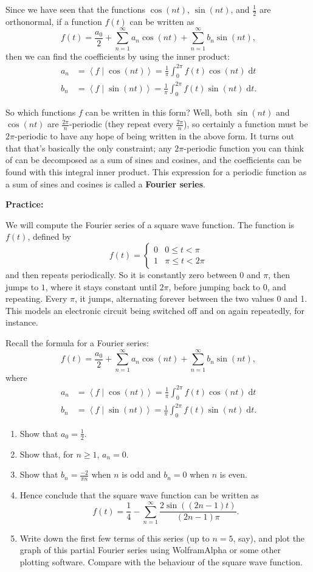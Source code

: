 \documentclass{article}
\newcommand{\diff}{\;\mathrm{d}}
\newcommand{\braket}[2]{\left\langle #1 \mid #2 \right\rangle}
\begin{document}
Since we have seen that the functions $\cos(nt)$, $\sin(nt)$, and $\frac{1}{2}$ are orthonormal, if a function $f(t)$ can be written as
\[f(t)=\frac{a_0}{2}+\sum_{n=1}^\infty a_n\cos(nt)+\sum_{n=1}^\infty b_n\sin(nt),\]
then we can find the coefficients by using the inner product:
\begin{align*}
	a_n&=\braket{f}{\cos(nt)}=\frac{1}{\pi}\int_0^{2\pi}f(t)\cos(nt)\diff t\\
	b_n&=\braket{f}{\sin(nt)}=\frac{1}{\pi}\int_0^{2\pi}f(t)\sin(nt)\diff t.
\end{align*}

So which functions $f$ can be written in this form? Well, both $\sin(nt)$ and $\cos(nt)$ are $\frac{2\pi}{n}$-periodic (they repeat every $\frac{2\pi}{n}$), so certainly a function must be $2\pi$-periodic to have any hope of being written in the above form. It turns out that that's basically the only constraint; any $2\pi$-periodic function you can think of can be decomposed as a sum of sines and cosines, and the coefficients can be found with this integral inner product. This expression for a periodic function as a sum of sines and cosines is called a \textbf{Fourier series}.

\clearpage


\textbf{Practice:}\bigskip

We will compute the Fourier series of a square wave function. The function is $f(t)$, defined by
\[f(t)=\begin{cases} 0 & 0\leq t<\pi\\ 1 & \pi\leq t<2\pi\end{cases}\]
and then repeats periodically. So it is constantly zero between 0 and $\pi$, then jumps to $1$, where it stays constant until $2\pi$, before jumping back to 0, and repeating. Every $\pi$, it jumps, alternating forever between the two values 0 and 1. This models an electronic circuit being switched off and on again repeatedly, for instance.

Recall the formula for a Fourier series:
\[f(t)=\frac{a_0}{2}+\sum_{n=1}^\infty a_n\cos(nt)+\sum_{n=1}^\infty b_n\sin(nt),\]
where
\begin{align*}
	a_n&=\braket{f}{\cos(nt)}=\frac{1}{\pi}\int_0^{2\pi}f(t)\cos(nt)\diff t\\
	b_n&=\braket{f}{\sin(nt)}=\frac{1}{\pi}\int_0^{2\pi}f(t)\sin(nt)\diff t.
\end{align*}

\begin{enumerate}
	\item Show that $a_0=\frac{1}{2}$.
	\item Show that, for $n\geq 1$, $a_n=0$.
	\item Show that $b_n=\frac{-2}{\pi n}$ when $n$ is odd and $b_n=0$ when $n$ is even.
	\item Hence conclude that the square wave function can be written as
		\[f(t)=\frac{1}{4}-\sum_{n=1}^\infty \frac{2\sin((2n-1)t)}{(2n-1)\pi}.\]
	\item Write down the first few terms of this series (up to $n=5$, say), and plot the graph of this partial Fourier series using WolframAlpha or some other plotting software. Compare with the behaviour of the square wave function.
\end{enumerate}
\end{document}
